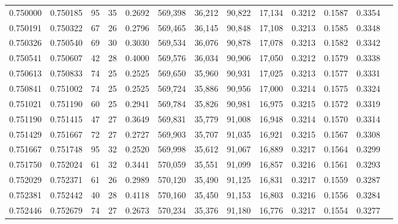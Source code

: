 \begin{tabular}{rrrrrrrrrrrrr}
0.750000 & 0.750185 &     95 &    35 &                                     0.2692 & 569,398 &  36,212 &  90,822 &  17,134 & 0.3212 & 0.1587 & 0.3354 \\
0.750191 & 0.750322 &     67 &    26 &                                     0.2796 & 569,465 &  36,145 &  90,848 &  17,108 & 0.3213 & 0.1585 & 0.3348 \\
0.750326 & 0.750540 &     69 &    30 &                                     0.3030 & 569,534 &  36,076 &  90,878 &  17,078 & 0.3213 & 0.1582 & 0.3342 \\
0.750541 & 0.750607 &     42 &    28 &                                     0.4000 & 569,576 &  36,034 &  90,906 &  17,050 & 0.3212 & 0.1579 & 0.3338 \\
0.750613 & 0.750833 &     74 &    25 &                                     0.2525 & 569,650 &  35,960 &  90,931 &  17,025 & 0.3213 & 0.1577 & 0.3331 \\
0.750841 & 0.751002 &     74 &    25 &                                     0.2525 & 569,724 &  35,886 &  90,956 &  17,000 & 0.3214 & 0.1575 & 0.3324 \\
0.751021 & 0.751190 &     60 &    25 &                                     0.2941 & 569,784 &  35,826 &  90,981 &  16,975 & 0.3215 & 0.1572 & 0.3319 \\
0.751190 & 0.751415 &     47 &    27 &                                     0.3649 & 569,831 &  35,779 &  91,008 &  16,948 & 0.3214 & 0.1570 & 0.3314 \\
0.751429 & 0.751667 &     72 &    27 &                                     0.2727 & 569,903 &  35,707 &  91,035 &  16,921 & 0.3215 & 0.1567 & 0.3308 \\
0.751667 & 0.751748 &     95 &    32 &                                     0.2520 & 569,998 &  35,612 &  91,067 &  16,889 & 0.3217 & 0.1564 & 0.3299 \\
0.751750 & 0.752024 &     61 &    32 &                                     0.3441 & 570,059 &  35,551 &  91,099 &  16,857 & 0.3216 & 0.1561 & 0.3293 \\
0.752029 & 0.752371 &     61 &    26 &                                     0.2989 & 570,120 &  35,490 &  91,125 &  16,831 & 0.3217 & 0.1559 & 0.3287 \\
0.752381 & 0.752442 &     40 &    28 &                                     0.4118 & 570,160 &  35,450 &  91,153 &  16,803 & 0.3216 & 0.1556 & 0.3284 \\
0.752446 & 0.752679 &     74 &    27 &                                     0.2673 & 570,234 &  35,376 &  91,180 &  16,776 & 0.3217 & 0.1554 & 0.3277 \\

\end{tabular}
